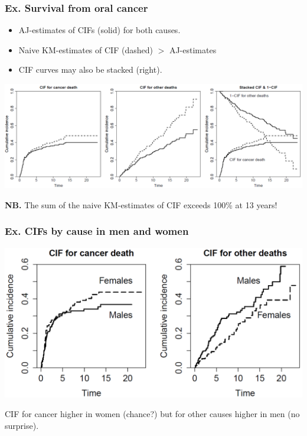\documentclass[handout,12pt]{beamer}
\begin{document}
\begin{frame}[fragile]
\frametitle{Ex. Survival from oral cancer}
\begin{itemize}
\item
AJ-estimates of CIFs (solid) for both causes.
\item
Naive KM-estimates of CIF (dashed) $>$ AJ-estimates 
\item
CIF curves may also be stacked (right).  
\end{itemize}
\includegraphics[width=\textwidth]{orcaCI1}

\textbf{NB.} The sum of the naive KM-estimates of CIF exceeds 100\% at 13 years! 
\end{frame}

\begin{frame}[fragile]
\frametitle{Ex. CIFs by cause in men and women}

\includegraphics[width=\textwidth]{orcaCI2}

CIF for cancer higher in women (chance?) but for other causes
higher in men (no surprise).

\end{frame}
\end{document}
